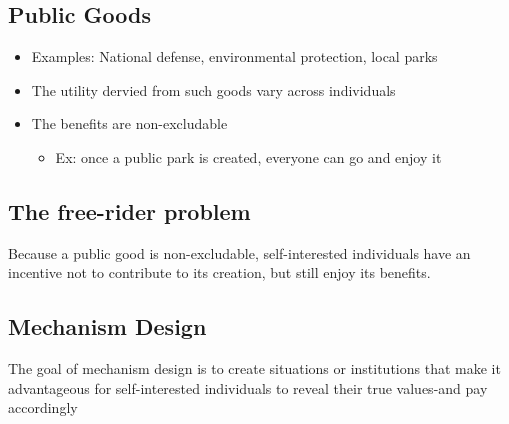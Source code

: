 \subsection{Public Goods}
\begin{itemize}
    \item Examples: National defense, environmental protection, local parks
    \item The utility dervied from such goods vary across individuals
    \item The benefits are non-excludable
    \begin{itemize}
        \item Ex: once a public park is created, everyone can go and enjoy it
    \end{itemize}
\end{itemize}
\subsection{The free-rider problem}
Because a public good is non-excludable, self-interested individuals have an incentive not to contribute to its creation, but still enjoy its benefits.
\subsection{Mechanism Design}
The goal of mechanism design is to create situations or institutions that make it advantageous for self-interested individuals to reveal their true values-and pay accordingly
